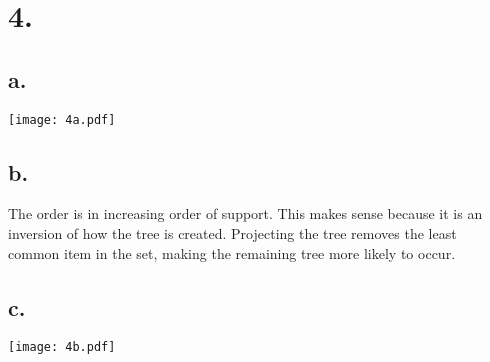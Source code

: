 \documentclass[11pt]{article}
\begin{document}
\section*{4.}
\label{sec:org684851b}
\subsection*{a.}
\label{sec:org40f7111}
\begin{center}
\texttt{[image: 4a.pdf]}
\end{center}

\subsection*{b.}
\label{sec:org77cee51}
The order is in increasing order of support. This makes sense because it is an
inversion of how the tree is created. Projecting the tree removes the least
common item in the set, making the remaining tree more likely to occur.

\subsection*{c.}
\label{sec:org5df37a1}
\begin{center}
\texttt{[image: 4b.pdf]}
\end{center}
\end{document}
